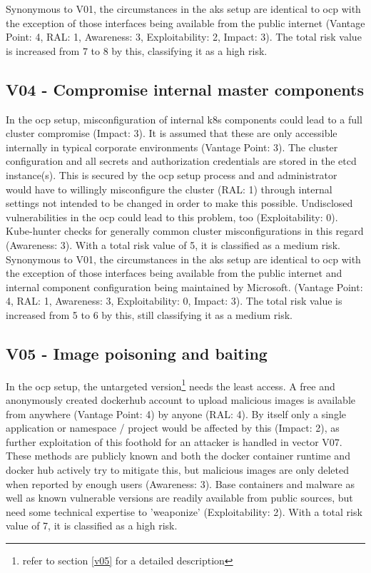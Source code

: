 Synonymous to V01, the circumstances in the \gls{aks} setup are identical to \gls{ocp} with the exception of those interfaces being available from the public internet (Vantage Point: 4, RAL: 1, Awareness: 3, Exploitability: 2, Impact: 3). 
The total risk value is increased from 7 to 8 by this, classifying it as a high risk.

\subsection{V04 - Compromise internal master components}

In the \gls{ocp} setup, misconfiguration of internal \gls{k8s} components could lead to a full cluster compromise (Impact: 3).  It is assumed that these are only accessible internally in typical corporate environments (Vantage Point: 3). The cluster configuration and all secrets and authorization credentials are stored in the etcd instance(s). This is secured by the \gls{ocp} setup process and and administrator would have to willingly misconfigure the cluster (RAL: 1) through internal settings not intended to be changed in order to make this possible. Undisclosed vulnerabilities in the \gls{ocp} could lead to this problem, too (Exploitability: 0).
Kube-hunter checks for generally common cluster misconfigurations in this regard (Awareness: 3).
With a total risk value of 5, it is classified as a medium risk. \\


Synonymous to V01, the circumstances in the \gls{aks} setup are identical to \gls{ocp} with the exception of those interfaces being available from the public internet and internal component configuration being maintained by Microsoft. (Vantage Point: 4, RAL: 1, Awareness: 3, Exploitability: 0, Impact: 3). 
The total risk value is increased from 5 to 6 by this, still classifying it as a medium risk.

\subsection{V05 - Image poisoning and baiting}

In the \gls{ocp} setup, the untargeted version\footnote{refer to section \ref{v05} for a detailed description} needs the least access. A free and anonymously created dockerhub account to upload malicious images is available from anywhere (Vantage Point: 4) by anyone (RAL: 4). By itself only a single application or namespace / project would be affected by this (Impact: 2), as further exploitation of this foothold for an attacker is handled in vector V07.
These methods are publicly known and both the docker container runtime and docker hub actively try to mitigate this, but malicious images are only deleted when reported by enough users (Awareness: 3).
Base containers and malware as well as known vulnerable versions are readily available from public sources, but need some technical expertise to 'weaponize' (Exploitability: 2).
With a total risk value of 7, it is classified as a high risk. \\


